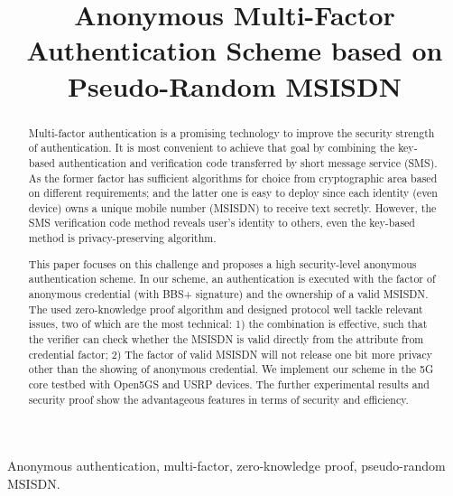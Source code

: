 \documentclass[lettersize,journal]{IEEEtran}
\begin{document}
\title{Anonymous Multi-Factor Authentication Scheme based on Pseudo-Random MSISDN}

\maketitle

\begin{abstract}
Multi-factor authentication is a promising technology to improve the security strength of authentication. It is most convenient to achieve that goal by combining the key-based authentication and verification code transferred by short message service (SMS). As the former factor has sufficient algorithms for choice from cryptographic area based on different requirements; and the latter one is easy to deploy since each identity (even device) owns a unique mobile number (MSISDN) to receive text secretly. However, the SMS verification code method reveals user's identity to others, even the key-based method is privacy-preserving algorithm.

This paper focuses on this challenge and proposes a high security-level anonymous authentication scheme. In our scheme, an authentication is executed with the factor of anonymous credential (with BBS+ signature) and the ownership of a valid MSISDN. The used zero-knowledge proof algorithm and designed protocol well tackle relevant issues, two of which are the most technical: 1) the combination is effective, such that the verifier can check whether the MSISDN is valid directly from the attribute from credential factor; 2) The factor of valid MSISDN will not release one bit more privacy other than the showing of anonymous credential. We implement our scheme in the 5G core testbed with Open5GS and USRP devices. The further experimental results and security proof show the advantageous features in terms of security and efficiency.
\end{abstract}

\begin{IEEEkeywords}
Anonymous authentication, multi-factor, zero-knowledge proof, pseudo-random MSISDN.
\end{IEEEkeywords}



%








%
%
%
%
%
%
%
%
%
%
%
%
\end{document}
